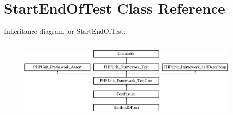 \section{Start\+End\+Of\+Test Class Reference}
\label{class_start_end_of_test}
Inheritance diagram for Start\+End\+Of\+Test\+:\begin{figure}[H]
\begin{center}
\leavevmode
\includegraphics[height=4.129793cm]{class_start_end_of_test}
\end{center}
\end{figure}
